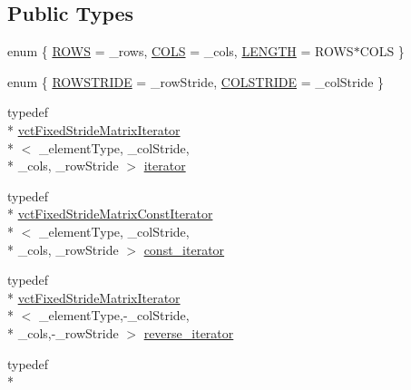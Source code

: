 \subsection*{Public Types}
\begin{DoxyCompactItemize}
\item 
enum \{ \hyperlink{classvct_fixed_size_matrix_traits_a99506cd46619256b0ad9c09afc88cfe4a4111cbfc8e82c98dfb13e63b65fc606b}{R\-O\-W\-S} = \-\_\-rows, 
\hyperlink{classvct_fixed_size_matrix_traits_a99506cd46619256b0ad9c09afc88cfe4af33df4089c668a48b5d59ac86af3138e}{C\-O\-L\-S} = \-\_\-cols, 
\hyperlink{classvct_fixed_size_matrix_traits_a99506cd46619256b0ad9c09afc88cfe4a6b0f4f5000cd410b68ea5903cd33ec2b}{L\-E\-N\-G\-T\-H} = R\-O\-W\-S$\ast$\-C\-O\-L\-S
 \}
\item 
enum \{ \hyperlink{classvct_fixed_size_matrix_traits_ac32aced1f46e5b302415ea1f2494dd40aef62e1a69a3a5647a2ade9f04f005f72}{R\-O\-W\-S\-T\-R\-I\-D\-E} = \-\_\-row\-Stride, 
\hyperlink{classvct_fixed_size_matrix_traits_ac32aced1f46e5b302415ea1f2494dd40ad831203257041b2517422372fd4faea2}{C\-O\-L\-S\-T\-R\-I\-D\-E} = \-\_\-col\-Stride
 \}
\item 
typedef \\*
\hyperlink{classvct_fixed_stride_matrix_iterator}{vct\-Fixed\-Stride\-Matrix\-Iterator}\\*
$<$ \-\_\-element\-Type, \-\_\-col\-Stride, \\*
\-\_\-cols, \-\_\-row\-Stride $>$ \hyperlink{classvct_fixed_size_matrix_traits_a677065481ada218e2559cdec92e97fd8}{iterator}
\item 
typedef \\*
\hyperlink{classvct_fixed_stride_matrix_const_iterator}{vct\-Fixed\-Stride\-Matrix\-Const\-Iterator}\\*
$<$ \-\_\-element\-Type, \-\_\-col\-Stride, \\*
\-\_\-cols, \-\_\-row\-Stride $>$ \hyperlink{classvct_fixed_size_matrix_traits_a8f7178fb03f45772c705fba16e08065d}{const\-\_\-iterator}
\item 
typedef \\*
\hyperlink{classvct_fixed_stride_matrix_iterator}{vct\-Fixed\-Stride\-Matrix\-Iterator}\\*
$<$ \-\_\-element\-Type,-\/\-\_\-col\-Stride, \\*
\-\_\-cols,-\/\-\_\-row\-Stride $>$ \hyperlink{classvct_fixed_size_matrix_traits_aa132098455575ae9bc4962c994273baa}{reverse\-\_\-iterator}
\item 
typedef \\*

\end{DoxyCompactItemize}
